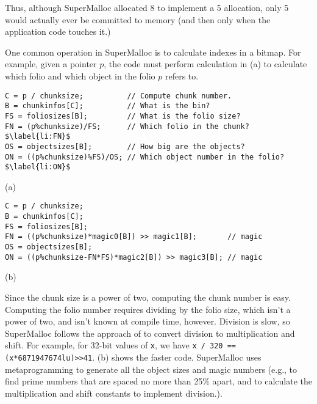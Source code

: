 \documentclass[natbib,sort&compress]{sigplanconf}
\newcommand{\code}[1]{\texttt{#1}}
\begin{document}
Thus, although SuperMalloc allocated \unit{8}\mebi\byte{} to implement
a \unit{5}\mebi\byte{} allocation, only \unit{5}\mebi\byte{} would
actually ever be committed to memory (and then only when the
application code touches it.)


One common operation in SuperMalloc is to calculate indexes in a
bitmap.  For example, given a pointer $p$, the code must perform
calculation in (a) to calculate which folio and which
object in the folio $p$ refers to.

\begin{figure*}
\begin{verbatim}
C = p / chunksize;          // Compute chunk number.
B = chunkinfos[C];          // What is the bin?
FS = foliosizes[B];         // What is the folio size?
FN = (p%chunksize)/FS;      // Which folio in the chunk?$\label{li:FN}$
OS = objectsizes[B];        // How big are the objects?
ON = ((p%chunksize)%FS)/OS; // Which object number in the folio?$\label{li:ON}$
\end{verbatim}
\begin{center}
(a)
\end{center}
\begin{verbatim}
C = p / chunksize;
B = chunkinfos[C];
FS = foliosizes[B];
FN = ((p%chunksize)*magic0[B]) >> magic1[B];       // magic
OS = objectsizes[B];
ON = ((p%chunksize-FN*FS)*magic2[B]) >> magic3[B]; // magic
\end{verbatim}
\begin{center}
(b)
\end{center}
\caption{The calculation to compute the folio number in the chunk,
  \code{FN}, and the object number in the folio \code{ON}, so that the
  bitmap for the free objects in the folio can be updated.  (a) shows
  the code with expensive divisions in .  (b) shows
  the code with the divisions replaced by multiplication and shift.}
\label{fig:bitindex}
\end{figure*}


Since the chunk size is a power of two, computing the chunk number is
easy.  Computing the folio number requires dividing by the folio size,
which isn't a power of two, and isn't known at compile time, however.
Division is slow, so SuperMalloc follows the approach of
\cite{MagenheimerPePe87} to convert division to multiplication and
shift.  For example, for 32-bit values of \code{x}, we have
\texttt{x / 320 == (x*6871947674lu)>>41}.  (b)
shows the faster code.  SuperMalloc uses metaprogramming to generate
all the object sizes and magic numbers (e.g., to find prime numbers
that are spaced no more than 25\% apart, and to calculate the
multiplication and shift constants to implement division.).
\end{document}

